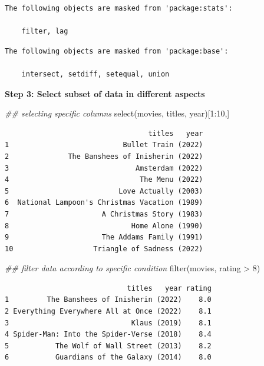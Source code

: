\documentclass[
  letterpaper,
  DIV=11,
  numbers=noendperiod]{scrreprt}
\newenvironment{Shaded}{\begin{snugshade}}{\end{snugshade}}
\newcommand{\DecValTok}[1]{\textcolor[rgb]{0.68,0.00,0.00}{#1}}
\newcommand{\DocumentationTok}[1]{\textcolor[rgb]{0.37,0.37,0.37}{\textit{#1}}}
\newcommand{\FunctionTok}[1]{\textcolor[rgb]{0.28,0.35,0.67}{#1}}
\newcommand{\NormalTok}[1]{\textcolor[rgb]{0.00,0.23,0.31}{#1}}
\newcommand{\SpecialCharTok}[1]{\textcolor[rgb]{0.37,0.37,0.37}{#1}}
\begin{document}
\begin{verbatim}
The following objects are masked from 'package:stats':

    filter, lag
\end{verbatim}

\begin{verbatim}
The following objects are masked from 'package:base':

    intersect, setdiff, setequal, union
\end{verbatim}

\textbf{Step 3: Select subset of data in different aspects}

\begin{Shaded}
\begin{Highlighting}[]
\DocumentationTok{\#\# selecting specific columns}
\FunctionTok{select}\NormalTok{(movies, titles, year)[}\DecValTok{1}\SpecialCharTok{:}\DecValTok{10}\NormalTok{,]}
\end{Highlighting}
\end{Shaded}

\begin{verbatim}
                                  titles   year
1                           Bullet Train (2022)
2              The Banshees of Inisherin (2022)
3                              Amsterdam (2022)
4                               The Menu (2022)
5                          Love Actually (2003)
6  National Lampoon's Christmas Vacation (1989)
7                      A Christmas Story (1983)
8                             Home Alone (1990)
9                      The Addams Family (1991)
10                   Triangle of Sadness (2022)
\end{verbatim}

\begin{Shaded}
\begin{Highlighting}[]
\DocumentationTok{\#\# filter data according to specific condition}
\FunctionTok{filter}\NormalTok{(movies, rating }\SpecialCharTok{\textgreater{}} \DecValTok{8}\NormalTok{)}
\end{Highlighting}
\end{Shaded}

\begin{verbatim}
                             titles   year rating
1         The Banshees of Inisherin (2022)    8.0
2 Everything Everywhere All at Once (2022)    8.1
3                             Klaus (2019)    8.1
4 Spider-Man: Into the Spider-Verse (2018)    8.4
5           The Wolf of Wall Street (2013)    8.2
6           Guardians of the Galaxy (2014)    8.0
\end{verbatim}
\end{document}
